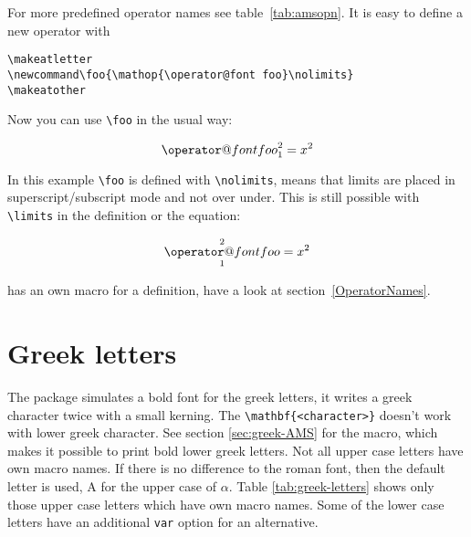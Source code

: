 \begin{table}[htb]
\makeatletter
\newcommand\foo{\mathop{\operator@font foo}\nolimits}
\makeatother
For more predefined operator names see table~\vref{tab:amsopn}. It is easy 
to define a new operator with
%
\begin{lstlisting}
\makeatletter
\newcommand\foo{\mathop{\operator@font foo}\nolimits}
\makeatother
\end{lstlisting}

Now you can use \verb|\foo| in the usual way:
%
\begin{LTXexample}[width=4cm]
\[ \foo_1^2 = x^2 \]
\end{LTXexample}
In this example \verb|\foo| is defined with \verb|\nolimits|, means 
that limits are placed in
superscript/subscript mode and not over under. This is still possible with \verb|\limits| in the
definition or the equation:
\begin{LTXexample}[width=4cm]
\[ \foo\limits_1^2 = x^2 \]
\end{LTXexample}

\AmSmath has an own macro for a definition, have a look at section~\vref{OperatorNames}.


\section{Greek letters}\label{sec:greek}
The \AmSmath package simulates a bold font for the greek letters, it writes a 
greek character twice with a small kerning.  The \verb|\mathbf{<character>}| 
doesn't work with lower greek character. See
section \vref{sec:greek-AMS} for the  macro, which makes it possible 
to print bold lower greek letters. Not all upper case letters have 
own macro names. If there is no difference to the roman font, then the default 
letter is used, \eg A for the upper case of
$\alpha$. Table \ref{tab:greek-letters} shows only those upper case letters 
which have own macro names. Some of the lower case letters have an additional 
\verb|var| option for an alternative.


\end{table}
